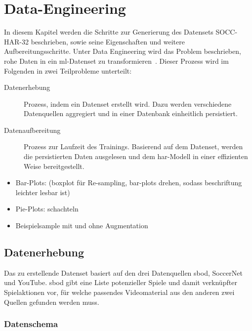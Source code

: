 \chapter{Data-Engineering}
\label{ch:data}

\newcommand{\noaction}{37521\ }
\newcommand{\novideos}{194\ }
\newcommand{\nomatches}{152\ }

In diesem Kapitel werden die Schritte zur Generierung des Datensets SOCC-HAR-32 beschrieben, sowie seine Eigenschaften und weitere Aufbereitungsschritte.
Unter Data Engineering wird das Problem beschrieben, rohe Daten in ein \gls{ml}-Datenset zu transformieren~\cite{Burkov19}.
Dieser Prozess wird im Folgenden in zwei Teilprobleme unterteilt:
\begin{description}
    \item[Datenerhebung] Prozess, indem ein Datenset erstellt wird.
        Dazu werden verschiedene Datenquellen aggregiert und in einer Datenbank einheitlich persistiert.
    \item[Datenaufbereitung] Prozess zur Laufzeit des Trainings.
        Basierend auf dem Datenset, werden die persistierten Daten ausgelesen und dem \gls{har}-Modell in einer effizienten Weise bereitgestellt.
\end{description}

\begin{tcolorbox}[title=WIP]
    \begin{itemize}
        \item Bar-Plots: (boxplot für Re-sampling, bar-plots drehen, sodass beschriftung leichter lesbar ist)
        \item Pie-Plots: schachteln
        \item Beispielsample mit und ohne Augmentation
    \end{itemize}
\end{tcolorbox}


\section{Datenerhebung}
\label{sec:datenerhebung}

Das zu erstellende Datenset basiert auf den drei Datenquellen \gls{sbod}, SoccerNet und YouTube.
\gls{sbod} gibt eine Liste potenzieller Spiele und damit verknüpfter Spielaktionen vor, für welche passendes Videomaterial aus den anderen zwei Quellen gefunden werden muss.

\subsection{Datenschema}
\label{subsec:schema}

